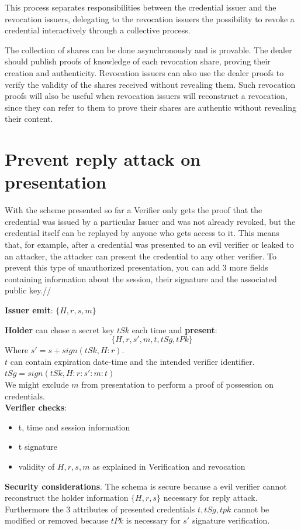 This process separates responsibilities between the credential issuer
and the revocation issuers, delegating to the revocation issuers the
possibility to revoke a credential interactively through a collective
process.

The collection of shares can be done asynchronously and is provable.
The dealer should publish proofs of knowledge of each revocation
share, proving their creation and authenticity. Revocation issuers can
also use the dealer proofs to verify the validity of the shares
received without revealing them. Such revocation proofs will also be
useful when revocation issuers will reconstruct a revocation, since
they can refer to them to prove their shares are authentic without
revealing their content.

\section{Prevent reply attack on presentation}
{\color{blue}
	With the scheme presented so far a Verifier only gets the proof that the
	credential was issued by a particular Issuer and was not already revoked, but the credential
	itself can be replayed by anyone who gets access to it.  This means
	that, for example, after a credential was presented to an evil verifier or leaked to an attacker, the attacker can present the credential to any other verifier.
	To prevent this type of unauthorized presentation, you can add 3 more fields containing information about the session, their signature and the associated public key.//
	
	\textbf{Issuer emit}: $\{H,r,s,m\}$
	
	\textbf{Holder} can chose a secret key $tSk$ each time and \textbf{present}:
	$$\{H,r,s',m,t,tSg,tPk\}$$
	Where $s'=s+sign(tSk,H:r)$.\\
	$t$ can contain expiration date-time and the intended verifier identifier.\\
	$tSg=sign(tSk,H:r:s':m:t)$\\
	We might exclude $m$ from presentation to perform a proof of possession on credentials.\\
	
	
	\textbf{Verifier checks}:
	\begin{itemize}
		\item t, time and session information
		\item t signature
		\item validity of $H,r,s,m$ as explained in Verification and revocation
	\end{itemize}	
	
	\textbf{Security considerations}. The schema is secure because a evil verifier cannot reconstruct the holder information $\{H,r,s\}$ necessary for reply attack. Furthermore the 3 attributes of presented credentials $t,tSg,tpk$ cannot be modified or removed because $tPk$ is necessary for $s'$ signature verification.
}



